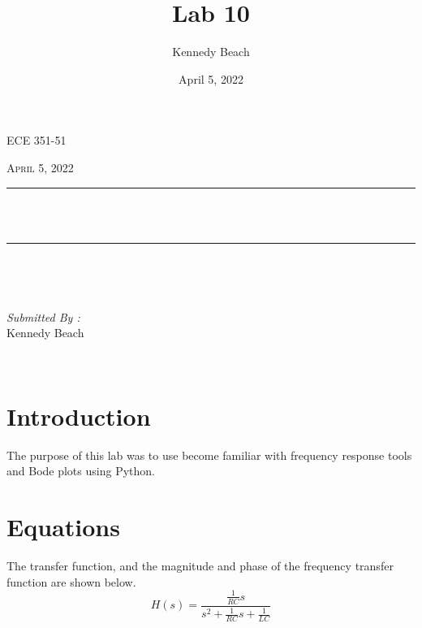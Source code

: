 \documentclass[12pt]{report}
\title{Lab 10}
\author{Kennedy Beach}
\date{April 5, 2022}
\makeatletter
\let\thetitle\@title
\makeatother
\begin{document}
\begin{titlepage}
\centering
\vspace*{0.5 cm}
\begin{center}    \textsc{\Large   ECE 351-51 }\\[2.0 cm]
\end{center}%
\textsc{\Large April 5, 2022}\\[0.5 cm] %
\rule{\linewidth}{0.2 mm} \\[0.4 cm]
{ \huge \bfseries \thetitle}\\
\rule{\linewidth}{0.2 mm} \\[1.5 cm]
\begin{minipage}{0.4\textwidth}
\begin{flushleft} \large
\end{flushleft}
\end{minipage}~
\begin{minipage}{0.4\textwidth}
\begin{flushright} \large
\emph{Submitted By :} \\
Kennedy Beach
\end{flushright}
\end{minipage}\\[2 cm]
\end{titlepage}
\tableofcontents
\pagebreak
\renewcommand{\thesection}{\arabic{section}}
\section{Introduction}
The purpose of this lab was to use become familiar with frequency response tools and Bode plots using Python.
\section{Equations}

The transfer function, and the magnitude and phase of the frequency transfer function are shown below.
\begin{equation*}
H(s) = \frac{\frac{1}{RC}s}{s^2+\frac{1}{RC}s+\frac{1}{LC}}
\end{equation*}
\end{document}
